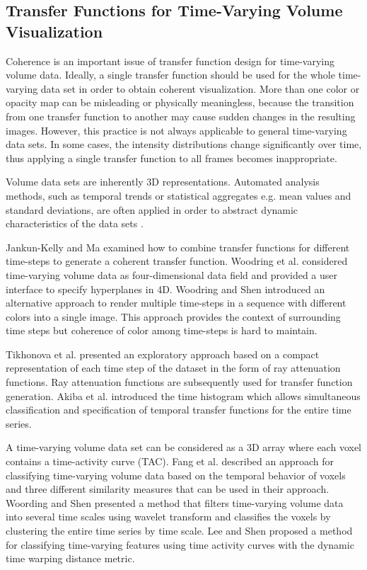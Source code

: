 \subsection{Transfer Functions for Time-Varying Volume Visualization}
Coherence is an important issue of transfer function design for time-varying volume data. Ideally, a single transfer function should be used for the whole time-varying data set in order to obtain coherent visualization. More than one color or opacity map can be misleading or physically meaningless, because the transition from one transfer function to another may cause sudden changes in the resulting images. However, this practice is not always applicable to general time-varying data sets. In some cases, the intensity distributions change significantly over time, thus applying a single transfer function to all frames becomes inappropriate.

Volume data sets are inherently 3D representations. Automated analysis methods, such as temporal trends or statistical aggregates e.g. mean values and standard deviations, are often applied in order to abstract dynamic characteristics of the data sets \cite{kehrer_visualization_2013}.

Jankun-Kelly and Ma \cite{jankun-kelly_study_2001} examined how to combine transfer functions for different time-steps to generate a coherent transfer function.
Woodring et al. \cite{woodring_high_2003} considered time-varying volume data as four-dimensional data field and provided a user interface to specify hyperplanes in 4D.
Woodring and Shen \cite{woodring_chronovolumes_2003} introduced an alternative approach to render multiple time-steps in a sequence with different colors into a single image. This approach provides the context of surrounding time steps but coherence of color among time-steps is hard to maintain.

Tikhonova et al. \cite{tikhonova_exploratory_2010} presented an exploratory approach based on a compact representation of each time step of the dataset in the form of ray attenuation functions. Ray attenuation functions are subsequently used for transfer function generation.
Akiba et al. \cite{akiba_simultaneous_2006} introduced the time histogram which allows simultaneous classification and specification of temporal transfer functions for the entire time series.

A time-varying volume data set can be considered as a 3D array where each voxel contains a time-activity curve (TAC). Fang et al. \cite{fang_visualization_2007} described an approach for classifying time-varying volume data based on the temporal behavior of voxels and three different similarity measures that can be used in their approach.
Woording and Shen \cite{woodring_multiscale_2009} presented a method that filters time-varying volume data into several time scales using wavelet transform and classifies the voxels by clustering the entire time series by time scale.
Lee and Shen \cite{lee_visualizing_2009} proposed a method for classifying time-varying features using time activity curves with the dynamic time warping distance metric.

